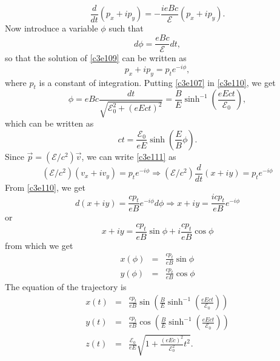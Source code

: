 \begin{enumerate}
\begin{equation}
\frac{d}{dt}(p_x + ip_y) = -\frac{ieBc}{\mathcal{E}}(p_x + ip_y).
\end{equation}
Now introduce a variable $\phi$ such that
\begin{equation}\label{c3e111}
d\phi = \frac{eBc}{\mathcal{E}}dt,
\end{equation}
so that the solution of \eqref{c3e109} can be written as
\begin{equation}\label{c3e112}
p_x + ip_y = p_t e^{-i\phi},
\end{equation}
where $p_t$ is a constant of integration. Putting \eqref{c3e107} in \eqref{c3e110},
we get
\begin{equation}\label{c3e113}
\phi = eBc\frac{dt}{\sqrt{\mathcal{E}_0^2 + (eEct)^2}} = \frac{B}{E}\sinh^{-1}
\left(\frac{eEct}{\mathcal{E}_0}\right),
\end{equation}
which can be written as
\begin{equation}\label{c3e114}
ct = \frac{\mathcal{E}_0}{eE}\sinh\left(\frac{E}{B}\phi\right).
\end{equation}
Since $\vec{p} = (\mathcal{E}/c^2)\vec{v}$, we can write \eqref{c3e111} as
\[
(\mathcal{E}/c^2)(v_x + iv_y) = p_t e^{-i\phi} \Rightarrow 
(\mathcal{E}/c^2)\frac{d}{dt}(x + iy) = p_te^{-i\phi}
\]
From \eqref{c3e110}, we get
\[
d(x + iy) = \frac{cp_t}{eB}e^{-i\phi}d\phi \Rightarrow x + iy = \frac{icp_t}{eB}e^{-i\phi}
\]
or
\[
x + iy = \frac{cp_t}{eB}\sin\phi + i\frac{cp_t}{eB}\cos\phi
\]
from which we get
\begin{eqnarray}
x(\phi) &=& \frac{cp_t}{eB}\sin\phi \label{c3e115} \\
y(\phi) &=& \frac{cp_t}{eB}\cos\phi \label{c3e116}
\end{eqnarray}
The equation of the trajectory is
\begin{eqnarray}
x(t) &=& \frac{cp_t}{eB}\sin\left(\frac{B}{E}\sinh^{-1}\left(\frac{eEct}{\mathcal{E}_0}\right)\right) \label{c3e117} \\
y(t) &=& \frac{cp_t}{eB}\cos\left(\frac{B}{E}\sinh^{-1}\left(\frac{eEct}{\mathcal{E}_0}\right)\right) \label{c3e118} \\
z(t) &=& \frac{\mathcal{E}_0}{eE}\sqrt{1 + \frac{(eEc)^2}{\mathcal{E}_0^2}t^2}. \label{c3e119}
\end{eqnarray}
\end{enumerate}


